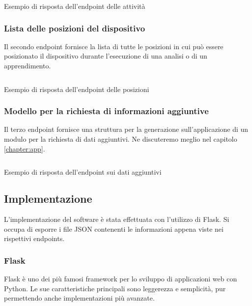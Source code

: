 \newpage
\begin{listing}[H] 
    \inputminted[frame=single,framesep=10pt]{json}{assets/snippets/server/api/activities.json}
    \caption{Esempio di risposta dell'endpoint delle attività}
    \label{listing:response-activities}
\end{listing}

\newpage
\subsubsection{Lista delle posizioni del dispositivo}
Il secondo endpoint fornisce la lista di tutte le posizioni in cui può essere posizionato il dispositivo durante l'esecuzione 
di una analisi o di un apprendimento.

\begin{listing}[H] 
    \inputminted[frame=single,framesep=10pt]{json}{assets/snippets/server/api/positions.json}
    \caption{Esempio di risposta dell'endpoint delle posizioni}
    \label{listing:response-positions}
\end{listing}

\newpage
\subsubsection{Modello per la richiesta di informazioni aggiuntive}
Il terzo endpoint fornisce una struttura per la generazione sull'applicazione di un modulo per la richiesta di dati aggiuntivi. 
Ne discuteremo meglio nel capitolo \ref{chapter:app}.

\begin{listing}[H] 
    \inputminted[frame=single,framesep=10pt]{json}{assets/snippets/server/api/form.json}
    \caption{Esempio di risposta dell'endpoint sui dati aggiuntivi}
    \label{listing:response-form}
\end{listing}

\subsection{Implementazione}
L'implementazione del software è stata effettuata con l'utilizzo di Flask. Si occupa di esporre i 
file JSON contenenti le informazioni appena viste nei rispettivi endpoints.

\subsubsection{Flask}
Flask \cite{flask} è uno dei più famosi framework per lo sviluppo di applicazioni web 
con Python. Le sue caratteristiche principali sono leggerezza e semplicità, pur permettendo anche implementazioni 
più avanzate.


